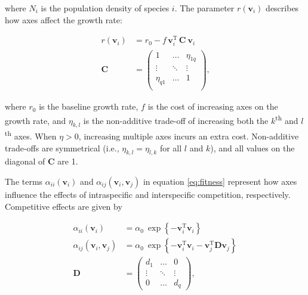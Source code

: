 \noindent where $N_i$ is the population density of  species $i$.
The parameter $r(\mathbf{v}_i)$ describes how axes affect
the growth rate:

\begin{equation} \label{eq:growth-rate}
\begin{split}
    r(\mathbf{v}_i) &= r_0 - f \, \mathbf{v}_i^{\textrm{T}} \, \mathbf{C} ~ \mathbf{v}_{i} \\
    \mathbf{C} &= \begin{pmatrix}
        1         & \ldots & \eta_{1q} \\
        \vdots    & \ddots & \vdots \\
        \eta_{q1} & \ldots & 1      \\
        \end{pmatrix}
    \textrm{,}
\end{split}
\end{equation}

\noindent where $r_0$ is the baseline growth rate,
$f$ is the cost of increasing axes on the growth rate, and
$\eta_{k,l}$ is the non-additive trade-off of increasing both the
$k$\textsuperscript{th} and $l$\textsuperscript{th} axes.
When $\eta > 0$, increasing multiple axes incurs an extra cost.
Non-additive trade-offs are symmetrical (i.e., $\eta_{k,l} = \eta_{l,k}$ for all
$l$ and $k$), and all values on the diagonal of $\mathbf{C}$ are 1.


The terms $\alpha_{ii}(\mathbf{v}_i)$ and
$\alpha_{ij}(\mathbf{v}_i, \mathbf{v}_j)$
in equation \ref{eq:fitness} represent how axes influence the effects
of intraspecific and interspecific competition, respectively.
Competitive effects are given by

\begin{equation} \label{eq:competition}
\begin{split}
    \alpha_{ii}(\mathbf{v}_i) &= \alpha_0 ~\exp \left\{
        - \mathbf{v}_i^{\textrm{T}}
        \mathbf{v}_i \right\} \\
    \alpha_{ij}(\mathbf{v}_i, \mathbf{v}_j) &= \alpha_0 ~\exp \left\{
        - \mathbf{v}_i^{\textrm{T}} \mathbf{v}_i -
        \mathbf{v}_j^{\textrm{T}} \mathbf{D} \mathbf{v}_j \right\} \\
    \mathbf{D} &= \begin{pmatrix}
        d_1     & \ldots    & 0 \\
        \vdots  & \ddots    & \vdots \\
        0       & \ldots    & d_q
        \end{pmatrix}
	\textrm{,}
\end{split}
\end{equation}



